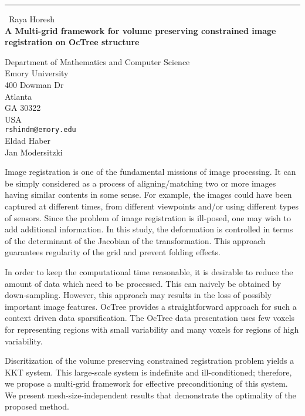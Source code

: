 \documentclass{report}
\begin{document}
\begin{center}
\rule{6in}{1pt} \
{\large Raya Horesh \\
{\bf A Multi-grid framework for volume preserving constrained image registration on OcTree structure}}

Department of Mathematics and Computer Science \\ Emory University \\ 400 Dowman Dr \\ Atlanta \\ GA 30322 \\ USA
\\
{\tt rshindm@emory.edu}\\
Eldad Haber\\
Jan Modersitzki\end{center}

Image registration is one of the fundamental missions of image
processing. It can be simply considered as a process of aligning/matching
two or more images having similar contents in some sense. For example,
the images could have been captured at different times, from different
viewpoints and/or using different types of sensors. Since the problem of
image registration is ill-posed, one may wish to add additional
information. In this study, the deformation is controlled in terms of the
determinant of the Jacobian of the transformation. This approach
guarantees regularity of the grid and prevent folding effects.

In order to keep the computational time reasonable, it is desirable to
reduce the amount of data which need to be processed. This can naively be
obtained by down-sampling. However, this approach may results in the loss
of possibly important image features. OcTree provides a straightforward
approach for such a context driven data sparsification. The OcTree data
presentation uses few voxels for representing regions with small
variability and many voxels for regions of high variability.

Discritization of the volume preserving constrained registration problem
yields a KKT system. This large-scale system is indefinite and
ill-conditioned; therefore, we propose a multi-grid framework for
effective preconditioning of this system. We present
mesh-size-independent results that demonstrate the optimality of the
proposed method.
\end{document}
